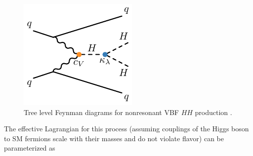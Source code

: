\begin{figure}[!thp]
\begin{minipage}[c]{.31\textwidth}
    \end{minipage}
    \begin{minipage}[c]{.31\textwidth}
        \includegraphics[width=\textwidth]{chapters/chapter1_theory/images/vbf_klambda.pdf}
    \end{minipage}

    \caption{Tree level Feynman diagrams for nonresonant \gls{VBF} $HH$ production \cite{vbf_4b}.}
    \label{fig:vbf_feyn}
\end{figure}

The effective Lagrangian for this process (assuming couplings of the Higgs boson to \gls{SM} fermions scale with their masses and do not violate flavor) can be parameterized as 

